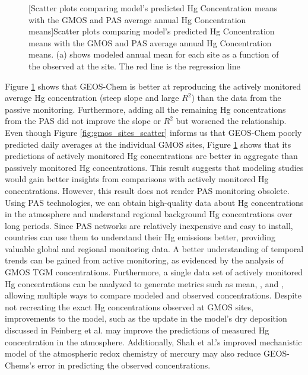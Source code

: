 \begin{flushleft}
\begin{figure}[H]
[Scatter plots comparing model's predicted Hg Concentration means with the GMOS and PAS average annual Hg Concentration means]{Scatter plots comparing model's predicted Hg Concentration means with the GMOS and PAS average annual Hg Concentration means. (a) shows modeled annual mean \hgc for each site as a function of the observed \hgc at the site. The red line is the regression line}
\label{fig:pas_vs_gmos}
\end{figure}
\FloatBarrier
Figure \ref{fig:pas_vs_gmos} shows that GEOS-Chem is better at reproducing  the actively monitored average Hg concentration (steep slope and large $R^2$) than the data from the passive monitoring. Furthermore, adding all the remaining Hg concentrations from the PAS did not improve the slope or $R^2$ but worsened the relationship. Even though Figure \ref{fig:gmos_sites_scatter} informs us that GEOS-Chem poorly predicted daily averages at the individual GMOS sites, Figure \ref{fig:pas_vs_gmos} shows that its predictions of actively monitored Hg concentrations are better in aggregate than passively monitored Hg concentrations. This result suggests that modeling studies would gain better insights from comparisons with actively monitored Hg concentrations. However, this result does not render PAS monitoring obsolete. Using PAS technologies, we can obtain high-quality data about Hg concentrations in the atmosphere and understand regional background Hg concentrations over long periods. Since PAS networks are relatively inexpensive and easy to install, countries can use them to understand their Hg emissions better, providing valuable global and regional monitoring data. A better understanding of temporal trends can be gained from active monitoring, as evidenced by the analysis of GMOS TGM concentrations.
Furthermore, a single data set of actively monitored Hg concentrations can be analyzed to generate metrics such as mean, \iq, and \nft, allowing multiple ways to compare modeled and observed concentrations. Despite  not recreating the exact Hg concentrations  observed at GMOS sites, improvements to the model, such as the update in the model's dry deposition discussed in Feinberg et al.\cite{feinberg_evaluating_2022} may improve the \gcs predictions of measured Hg concentration in the atmosphere. Additionally, Shah et al.'s\cite{shah_improved_2021} improved mechanistic model of the atmospheric redox chemistry of mercury may also reduce  GEOS-Chems's error in predicting the observed concentrations.
\end{flushleft}

